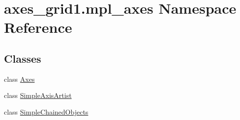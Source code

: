 \hypertarget{namespaceaxes__grid1_1_1mpl__axes}{}\section{axes\+\_\+grid1.\+mpl\+\_\+axes Namespace Reference}
\label{namespaceaxes__grid1_1_1mpl__axes}
\subsection*{Classes}
\begin{DoxyCompactItemize}
\item 
class \hyperlink{classaxes__grid1_1_1mpl__axes_1_1Axes}{Axes}
\item 
class \hyperlink{classaxes__grid1_1_1mpl__axes_1_1SimpleAxisArtist}{Simple\+Axis\+Artist}
\item 
class \hyperlink{classaxes__grid1_1_1mpl__axes_1_1SimpleChainedObjects}{Simple\+Chained\+Objects}
\end{DoxyCompactItemize}
